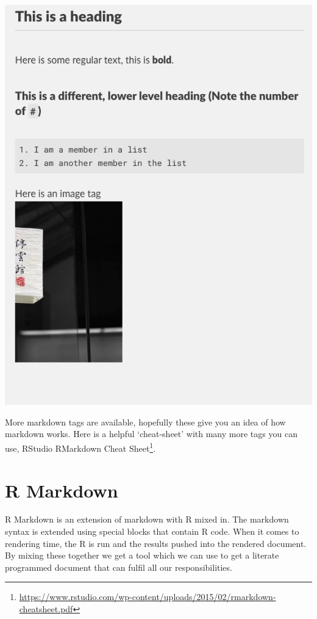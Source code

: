\documentclass[
]{book}
\renewcommand{\href}[2]{#2\footnote{\url{#1}}}
\begin{document}
\includegraphics{fig/simple_md.png}

More markdown tags are available, hopefully these give you an idea of how markdown works. Here is a helpful `cheat-sheet' with many more tags you can use, \href{https://www.rstudio.com/wp-content/uploads/2015/02/rmarkdown-cheatsheet.pdf}{RStudio RMarkdown Cheat Sheet}.

\hypertarget{r-markdown}{%
\section{R Markdown}\label{r-markdown}}

R Markdown is an extension of markdown with R mixed in. The markdown syntax is extended using special blocks that contain R code. When it comes to rendering time, the R is run and the results pushed into the rendered document. By mixing these together we get a tool which we can use to get a literate programmed document that can fulfil all our responsibilities.
\end{document}
